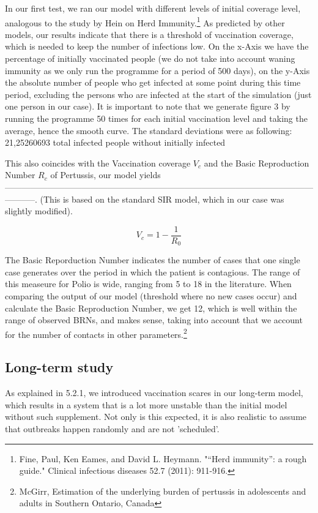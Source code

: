 \documentclass[11pt]{article}
\begin{document}
In our first test, we ran our model with different levels of initial coverage level, analogous to the study by Hein on Herd Immunity.\footnote{Fine, Paul, Ken Eames, and David L. Heymann. "“Herd immunity”: a rough guide." Clinical infectious diseases 52.7 (2011): 911-916.} As predicted by other models, our results indicate that there is a threshold of vaccination coverage, which is needed to keep the number of infections low. On the x-Axis we have the percentage of initially vaccinated people (we do not take into account waning immunity as we only run the programme for a period of 500 days), on the y-Axis the absolute number of people who get infected at some point during this time period, excluding the persons who are infected at the start of the simulation (just one person in our case). It is important to note that we generate figure 3 by running the programme 50 times for each initial vaccination level and taking the average, hence the smooth curve. The standard deviations were as following: 21,25260693
 total infected people without initially infected

This also coincides with the Vaccination coverage $V_{c}$ and the Basic Reproduction Number $R_{c}$ of Pertussis, our model yields -----------------------------------------------------------------------------------------------------------------------. (This is based on the standard SIR model, which in our case was slightly modified). 

\begin{equation}
V_{c} = 1-\dfrac{1}{R_{0}}
\end{equation}

The Basic Reporduction Number indicates the number of cases that one single case generates over the period in which the patient is contagious. The range of this measeure for Polio is wide, ranging from 5 to 18 in the literature. When comparing the output of our model (threshold where no new cases occur) and calculate the Basic Reproduction Number, we get 12, which is well within the range of observed BRNs, and makes sense, taking into account that we account for the number of contacts in other parameters.\footnote{McGirr, Estimation of the underlying burden of pertussis in adolescents and adults in Southern Ontario, Canada} 




\subsection{Long-term study}
As explained in 5.2.1, we introduced vaccination scares in our long-term model, which results in a system that is a lot more unstable than the initial model without such supplement. Not only is this expected, it is also realistic to assume that outbreaks happen randomly and are not 'scheduled'. 
\end{document}
